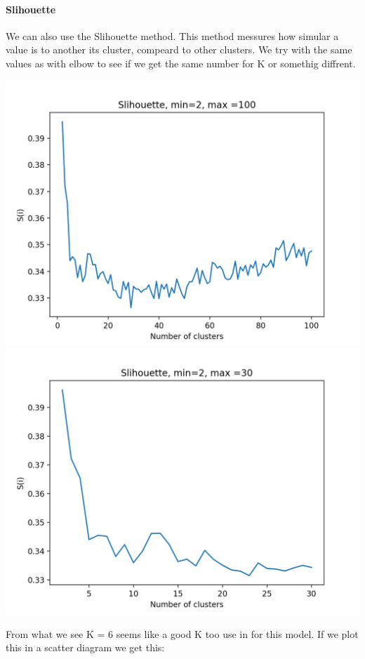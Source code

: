 \documentclass[10pt]{article}
\begin{document}
    \paragraph{Slihouette}
    We can also use the Slihouette method. This method messures how simular a value is to another its cluster, compeard to other clusters. We try with the same values as with elbow to see if we get the same number for K or somethig diffrent.

    \includegraphics[scale=0.35]{slih_line_100.png}
    \includegraphics[scale=0.35]{slih_line_30.png}

    From what we see K = 6 seems like a good K too use in for this model. If we plot this in a scatter diagram we get this:
\end{document}
